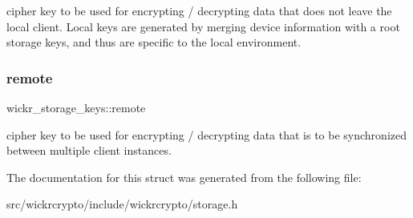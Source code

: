 cipher key to be used for encrypting / decrypting data that does not leave the local client. Local keys are generated by merging device information with a root storage keys, and thus are specific to the local environment. \mbox{\label{structwickr__storage__keys_a44b6a0b14bcc877cb6799265b060cb28}} 
\subsubsection{\texorpdfstring{remote}{remote}}
{\footnotesize\ttfamily wickr\+\_\+storage\+\_\+keys\+::remote}

cipher key to be used for encrypting / decrypting data that is to be synchronized between multiple client instances. 

The documentation for this struct was generated from the following file\+:\begin{DoxyCompactItemize}
\item 
src/wickrcrypto/include/wickrcrypto/storage.\+h\end{DoxyCompactItemize}
